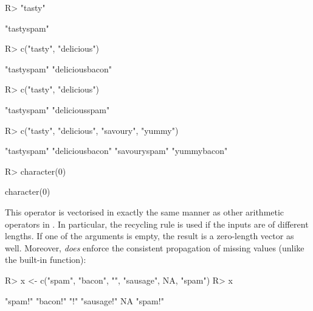 \documentclass[nojss]{jss}\usepackage[]{graphicx}\usepackage[]{color}
\begin{document}
\begin{Schunk}
\begin{Sinput}
R> "tasty" %s+% "spam"
\end{Sinput}
\begin{Soutput}
[1] "tastyspam"
\end{Soutput}
\begin{Sinput}
R> c("tasty", "delicious") %s+% c("spam", "bacon")  # elementwise
\end{Sinput}
\begin{Soutput}
[1] "tastyspam"      "deliciousbacon"
\end{Soutput}
\begin{Sinput}
R> c("tasty", "delicious") %s+% "spam"              # recycling rule
\end{Sinput}
\begin{Soutput}
[1] "tastyspam"     "deliciousspam"
\end{Soutput}
\begin{Sinput}
R> c("tasty", "delicious", "savoury", "yummy") %s+% c("spam", "bacon")
\end{Sinput}
\begin{Soutput}
[1] "tastyspam"      "deliciousbacon" "savouryspam"    "yummybacon"
\end{Soutput}
\begin{Sinput}
R> character(0) %s+% c("spam", "bacon")
\end{Sinput}
\begin{Soutput}
character(0)
\end{Soutput}
\end{Schunk}

This operator is vectorised in exactly the same manner
as other arithmetic operators in .
In particular, the recycling rule is used if the inputs are of different
lengths. If one of the arguments is empty, the result is a zero-length
vector as well. Moreover,  \textit{does} enforce the consistent
propagation of missing values
(unlike the built-in  function):

\begin{Schunk}
\begin{Sinput}
R> x <- c("spam", "bacon", "", "sausage", NA, "spam")
R> x %s+% "!"
\end{Sinput}
\begin{Soutput}
[1] "spam!"    "bacon!"   "!"        "sausage!" NA         "spam!"
\end{Soutput}
\end{Schunk}
\end{document}
